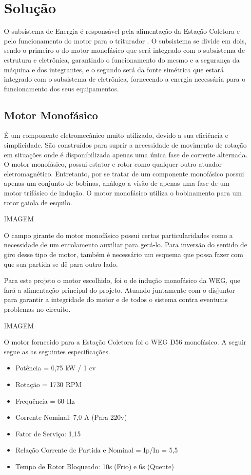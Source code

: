 \section{Solução}
O subsistema de Energia é responsável pela alimentação da Estação Coletora e pelo funcionamento do motor para o triturador . O subsistema se divide em dois, sendo o primeiro o do motor monofásico que será integrado com o subsistema de estrutura e eletrônica, garantindo o funcionamento do mesmo e a segurança da máquina e dos integrantes, e o segundo será da fonte simétrica que estará integrado com o subsistema de eletrônica, fornecendo a energia necessária para o funcionamento dos seus equipamentos.

\subsection{Motor Monofásico}
É um componente eletromecânico muito utilizado, devido a sua eficiência e simplicidade. São construídos para suprir a necessidade de movimento de rotação em situações onde é disponibilizada apenas uma única fase de corrente alternada. 
O motor monofásico, possui estator e rotor como qualquer outro atuador eletromagnético. Entretanto, por se tratar de um componente monofásico possui apenas um conjunto de bobinas, análogo a visão de apenas uma fase de um motor trifásico de indução. O motor monofásico utiliza o bobinamento para um rotor gaiola de esquilo.

IMAGEM

O campo girante do motor monofásico possui certas particularidades como a necessidade de um enrolamento auxiliar para gerá-lo. Para inversão do sentido de giro desse tipo de motor, também é necessário um esquema que possa fazer com que sua partida se dê para outro lado. 

Para este projeto o motor escolhido, foi o de indução monofásico da WEG, que fará a alimentação principal do projeto. Atuando juntamente com o disjuntor para garantir a integridade do motor e de todos o sistema contra eventuais problemas no circuito. 

IMAGEM

O motor fornecido para a Estação Coletora foi o WEG D56 monofásico. A seguir segue as  as seguintes especificações.

\begin{itemize}
    \item Potência = 0,75 kW / 1 cv
    \item Rotação = 1730 RPM
    \item Frequência = 60 Hz
    \item Corrente Nominal: 7,0 A (Para 220v)
    \item Fator de Serviço: 1,15
    \item Relação Corrente de Partida e Nominal = Ip/In = 5,5
    \item Tempo de Rotor Bloqueado: 10s (Frio) e 6s (Quente)
\end{itemize}


